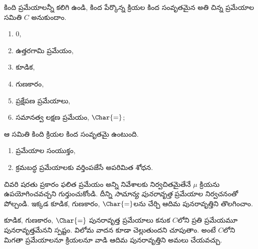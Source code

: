 \documentclass[../../../include/open-logic-section]{subfiles}
\begin{document}

కింది ప్రమేయాలన్నీ కలిగి ఉండి, కింద పేర్కొన్న క్రియల కింద సంవృతమైన అతి చిన్న ప్రమేయాల సమితి $C$ అనుకుందాం.
\begin{enumerate}
\item $0$,
\item ఉత్తరగామి ప్రమేయం,
\item కూడిక,
\item గుణకారం,
\item ప్రక్షేపణ ప్రమేయాలు,
\item సమానత్వ లక్షణ ప్రమేయం, $\Char{=}$;
\end{enumerate}
ఆ సమితి కింది క్రియల కింద సంవృతమై ఉంటుంది.
\begin{enumerate}
\item ప్రమేయాల సంయుక్తం,
\item క్రమబద్ధ ప్రమేయాలకు వర్తింపజేసే అపరిమిత శోధన.
\end{enumerate}
చివరి షరతు ప్రకారం ఫలిత ప్రమేయం అన్ని నివేశాలకు నిర్వచితమైతేనే $\mu$ క్రియను ఉపయోగించవచ్చని గుర్తుంచుకోండి. దీన్ని \emph{సామాన్య పునరావృత్త} ప్రమేయాల నిర్వచనంతో పోల్చండి. ఇక్కడ కూడిక, గుణకారం, $\Char{=}$లను చేర్చి ఆదిమ పునరావృత్తిని తొలగించాం.

కూడిక, గుణకారం, $\Char{=}$ పునరావృత్త ప్రమేయాలు కనుక $C$లోని ప్రతి ప్రమేయమూ పునరావృత్తమేనని స్పష్టం. విలోమ వాదన కూడా చెల్లుతుందని చూపుతాం. అంటే $C$లోని మిగతా ప్రమేయాలనూ క్రియలనూ వాడి ఆదిమ పునరావృత్తిని అమలు చేయవచ్చు.
\end{document}
